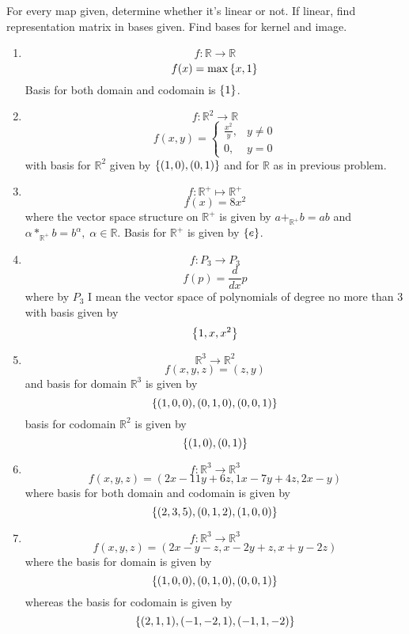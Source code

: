\documentclass[12pt]{article} %
\title{}
\begin{document}
\maketitle
For every map given, determine whether it's linear or not. If linear, find representation matrix in bases given. Find bases for kernel and
image.
\begin{enumerate}
\item \[f:\mathbb{R}\to\mathbb{R}\]
	\[f(x)=\max\mycbra{x,1}\]
Basis for both domain and codomain is $\left\{1\right\}$.
\item \[f:\mathbb{R}^2\to\mathbb{R}\]
	\[f(x,y)=\left\{\begin{array}{ll}
		\frac{x^2}{y},&y\neq0\\
		0,&y=0
	\end{array}\right.\]
	with basis for $\mathbb{R}^2$ given by $\left\{(1,0),(0,1)\right\}$ and for $\mathbb{R}$ as in previous problem.
\item \[f:\mathbb{R}^+\mapsto\mathbb{R}^+\]
	\[f(x)=8x^2\]
	where the vector space structure on $\mathbb{R}^+$ is given by $a+_{\mathbb{R}^+}b=ab$ and $\alpha*_{\mathbb{R}^+}b=b^{\alpha},\;\alpha
	\in\mathbb{R}$. Basis for $\mathbb{R}^+$ is given by $\left\{e\right\}$.
\item \[f:P_3\to P_3\]
	\[f(p)=\frac{d}{dx}p\]
	where by $P_3$ I mean the vector space of polynomials of degree no more than 3 with basis given by
	\[\left\{1,x,x^2\right\}\]

\item \[\mathbb{R}^3\to\mathbb{R}^2\]
	\[f(x,y,z)=(z,y)\]
	and basis for domain $\mathbb{R}^3$ is given by
	\[\left\{(1,0,0),(0,1,0),(0,0,1)\right\}\]
	basis for codomain $\mathbb{R}^2$ is given by
	\[\left\{(1,0),(0,1)\right\}\]
\item \[f:\mathbb{R}^3\to\mathbb{R}^3\]%
	\[f(x,y,z)=(2x-11y+6z,1x-7y+4z,2x-y)\]
	where basis for both domain and codomain is given by
	\[\left\{(2,3,5),(0,1,2),(1,0,0)\right\}\]
\item \[f:\mathbb{R}^3\to\mathbb{R}^3\]%
	\[f(x,y,z)=(2x-y-z,x-2y+z,x+y-2z)\]
	where the basis for domain is given by
	\[\left\{(1,0,0),(0,1,0),(0,0,1)\right\}\]
	whereas the basis for codomain is given by
	\[\left\{(2,1,1),(-1,-2,1),(-1,1,-2)\right\}\]


\end{enumerate}
\end{document}
